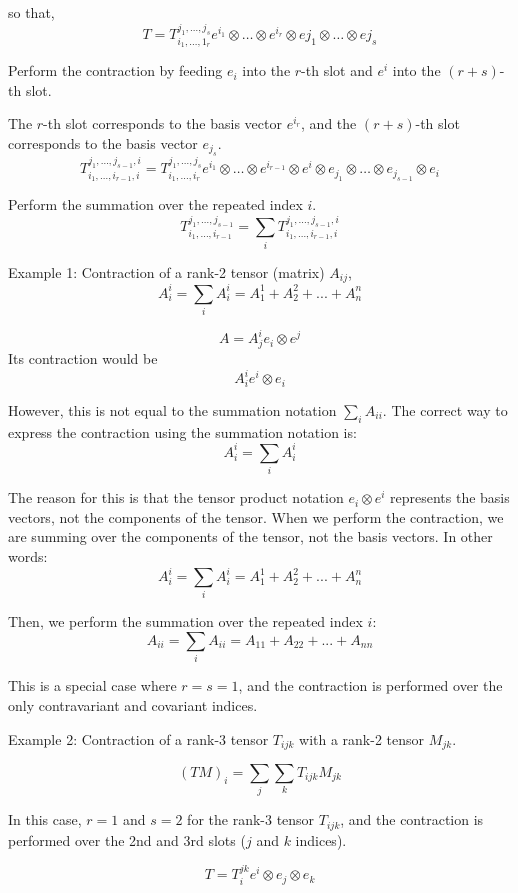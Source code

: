 so that,
$$
T = T_{i_1, \dots , 1_r }^{j_1 , \dots , j_s} e^{i_1} \otimes \dots \otimes e^{i_r} \otimes e{j_1} \otimes \dots \otimes e{j_s}
$$


Perform the contraction by feeding $e_i$ into the $r$-th slot and $e^i$ into the $(r+s)$-th slot.

The $r$-th slot corresponds to the basis vector $e^{i_r}$, and the $(r+s)$-th slot corresponds to the basis vector $e_{j_s}$.
$$
T_{i_1, \dots, i_{r-1}, i}^{j_1, \dots, j_{s-1}, i} =
T_{i_1, \dots, i_r}^{j_1, \dots, j_s} e^{i_1} \otimes \dots \otimes e^{i_{r-1}} \otimes e^i \otimes e_{j_1} \otimes \dots \otimes e_{j_{s-1}} \otimes e_i
$$

Perform the summation over the repeated index $i$.
$$
T_{i_1, \dots, i_{r-1}}^{j_1, \dots, j_{s-1}} = \sum_i T_{i_1, \dots, i_{r-1}, i}^{j_1, \dots, j_{s-1}, i}
$$


Example 1: Contraction of a rank-2 tensor (matrix) $A_{ij}$,
$$
A^i_i = \sum_i A^i_i = A^1_1 + A^2_2 + ... + A^n_n
$$

$$
A = A^i_j e_i \otimes e^j
$$
Its contraction would be
$$
A_{i}^{i} e^i \otimes e_i
$$

However, this is not equal to the summation notation $\sum_i A_{ii}$.
The correct way to express the contraction using the summation notation is:
$$
A^i_i = \sum_i A^i_i
$$

The reason for this is that the tensor product notation $e_i \otimes e^i$
represents the basis vectors, not the components of the tensor.
When we perform the contraction, we are summing over the components of the tensor, not the basis vectors.
In other words:
$$
A^i_i = \sum_i A^i_i = A^1_1 + A^2_2 + ... + A^n_n
$$

Then, we perform the summation over the repeated index $i$:
$$
A_{ii} = \sum_i A_{ii} = A_{11} + A_{22} + ... + A_{nn}
$$

This is a special case where $r = s = 1$,
and the contraction is performed over the only contravariant and covariant indices.



Example 2: Contraction of a rank-3 tensor $T_{ijk}$ with a rank-2 tensor $M_{jk}$.

$$
(TM)_i = \sum_j \sum_k T_{ijk} M_{jk}
$$

In this case, $r = 1$ and $s = 2$ for the rank-3 tensor $T_{ijk}$,
and the contraction is performed over the 2nd and 3rd slots ($j$ and $k$ indices).

$$
T = T_{i}^{jk} e^i \otimes e_j \otimes e_k
$$

